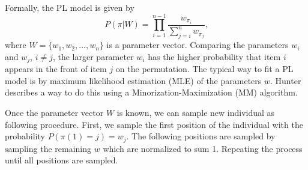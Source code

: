 Formally, the PL model is given by
\begin{equation}
    P(\pi|W) = \prod_{i=1}^{n-1}\frac{w_{\pi_i}}{\sum_{j=i}^{n}{w_{\pi_j}}} \text{,}
    \label{eq:pl_mdoel}
\end{equation}
where $W=\lbrace w_1,w_2,...,w_n\rbrace$ is a parameter vector. Comparing the parameters $w_i$ and $w_j$, $i\neq j$, the larger parameter $w_i$ has the higher probability that item $i$ appears in the front of item $j$ on the permutation. The typical way to fit a PL model is by maximum likelihood estimation (MLE) of the parameters $w$. Hunter~\citep{hunter2004mm} describes a way to do this using a Minorization-Maximization (MM) algorithm.

Once the parameter vector $W$ is known, we can sample new individual as following procedure. First, we sample the first position of the individual with the probability $P(\pi(1)=j)=w_j$. The following positions are sampled by sampling the remaining $w$ which are normalized to sum 1. Repeating the process until all positions are sampled.




